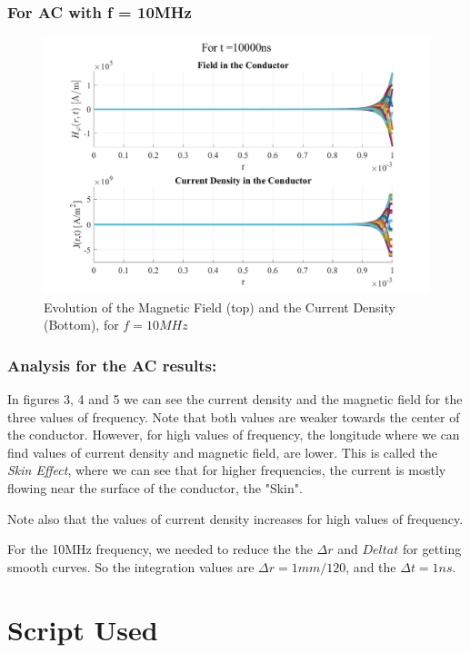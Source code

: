 \documentclass{article}
\begin{document}
\subsubsection{For AC with f = 10MHz}

\begin{figure}[ht]
\centering
\includegraphics[scale=0.235]{AC_10MHz}
\caption{Evolution of the Magnetic Field (top) and the Current Density (Bottom), for $f = 10MHz$}
\end{figure}

\subsubsection{Analysis for the AC results:}

In figures 3, 4 and 5 we can see the current density and the magnetic field for the three values of frequency. Note that both values are weaker towards the center of the conductor. However, for high values of frequency, the longitude where we can find values of current density and magnetic field, are lower. This is called the \textit{Skin Effect}, where we can see that for higher frequencies, the current is mostly flowing near the surface of the conductor, the "Skin". 

Note also that the values of current density increases for high values of frequency. 

For the 10MHz frequency, we needed to reduce the the $\Delta r$ and $Delta t$ for getting smooth curves. So the integration values are $\Delta r = 1mm/120$, and the $\Delta t = 1 ns$. 

\section{Script Used}


\end{document}
